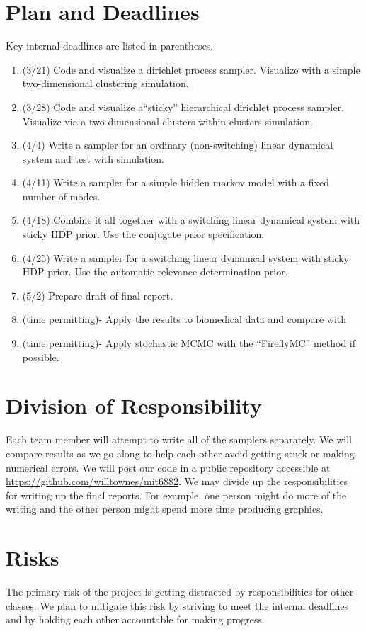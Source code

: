 \documentclass[12pt]{article}
\begin{document}
\section{Plan and Deadlines}
Key internal deadlines are listed in parentheses.
\begin{enumerate}
\item (3/21) Code and visualize a dirichlet process sampler. Visualize with a simple two-dimensional clustering simulation.
\item (3/28) Code and visualize a``sticky'' hierarchical dirichlet process sampler. Visualize via a two-dimensional clusters-within-clusters simulation.
\item (4/4) Write a sampler for an ordinary (non-switching) linear dynamical system and test with simulation.
\item (4/11) Write a sampler for a simple hidden markov model with a fixed number of modes.
\item (4/18) Combine it all together with a switching linear dynamical system with sticky HDP prior. Use the conjugate prior specification.
\item (4/25) Write a sampler for a switching linear dynamical system with sticky HDP prior. Use the automatic relevance determination prior.
\item (5/2) Prepare draft of final report.
\item (time permitting)- Apply the results to biomedical data and compare with \cite{lehman_physiological_2015}
\item (time permitting)- Apply stochastic MCMC with the ``FireflyMC'' method \cite{maclaurin_firefly_2014} if possible.
\end{enumerate}

\section{Division of Responsibility}
Each team member will attempt to write all of the samplers separately. We will compare results as we go along to help each other avoid getting stuck or making numerical errors. We will post our code in a public repository accessible at \url{https://github.com/willtownes/mit6882}. We may divide up the responsibilities for writing up the final reports. For example, one person might do more of the writing and the other person might spend more time producing graphics.

\section{Risks}
The primary risk of the project is getting distracted by responsibilities for other classes. We plan to mitigate this risk by striving to meet the internal deadlines and by holding each other accountable for making progress.
\end{document}
